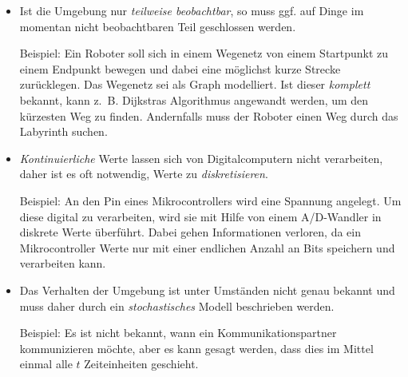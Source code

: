 \documentclass[a4paper]{scrartcl}
\begin{document}
\begin{itemize}
    \item
        Ist die Umgebung nur \emph{teilweise beobachtbar}, so muss ggf. auf
        Dinge im momentan nicht beobachtbaren Teil geschlossen werden.

        Beispiel: Ein Roboter soll sich in einem Wegenetz von einem Startpunkt
        zu einem Endpunkt bewegen und dabei eine möglichst kurze Strecke
        zurücklegen.  Das Wegenetz sei als Graph modelliert.  Ist dieser
        \emph{komplett} bekannt, kann z.~B. Dijkstras Algorithmus angewandt
        werden, um den kürzesten Weg zu finden.  Andernfalls muss der Roboter
        einen Weg durch das Labyrinth suchen.

    \item
        \emph{Kontinuierliche} Werte lassen sich von Digitalcomputern nicht
        verarbeiten, daher ist es oft notwendig, Werte zu
        \emph{diskretisieren}.

        Beispiel: An den Pin eines Mikrocontrollers wird eine Spannung
        angelegt. Um diese digital zu verarbeiten, wird sie mit Hilfe von einem
        A/D-Wandler in diskrete Werte überführt. Dabei gehen Informationen
        verloren, da ein Mikrocontroller Werte nur mit einer endlichen Anzahl
        an Bits speichern und verarbeiten kann.

    \item
        Das Verhalten der Umgebung ist unter Umständen nicht genau bekannt und
        muss daher durch ein \emph{stochastisches} Modell beschrieben werden.

        Beispiel: Es ist nicht bekannt, wann ein Kommunikationspartner
        kommunizieren möchte, aber es kann gesagt werden, dass dies im Mittel
        einmal alle $t$ Zeiteinheiten geschieht.

\end{itemize}
\end{document}
